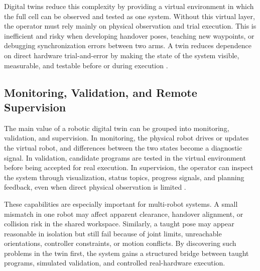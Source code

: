 Digital twins reduce this complexity by providing a virtual environment in which the full cell can be observed and tested as one system. Without this virtual layer, the operator must rely mainly on physical observation and trial execution. This is inefficient and risky when developing handover poses, teaching new waypoints, or debugging synchronization errors between two arms. A twin reduces dependence on direct hardware trial-and-error by making the state of the system visible, measurable, and testable before or during execution \cite{wang2017collaborative,tao2018digital}.

\subsection{Monitoring, Validation, and Remote Supervision}

The main value of a robotic digital twin can be grouped into monitoring, validation, and supervision. In monitoring, the physical robot drives or updates the virtual robot, and differences between the two states become a diagnostic signal. In validation, candidate programs are tested in the virtual environment before being accepted for real execution. In supervision, the operator can inspect the system through visualization, status topics, progress signals, and planning feedback, even when direct physical observation is limited \cite{glaessgen2012digital,wang2017collaborative}.

These capabilities are especially important for multi-robot systems. A small mismatch in one robot may affect apparent clearance, handover alignment, or collision risk in the shared workspace. Similarly, a taught pose may appear reasonable in isolation but still fail because of joint limits, unreachable orientations, controller constraints, or motion conflicts. By discovering such problems in the twin first, the system gains a structured bridge between taught programs, simulated validation, and controlled real-hardware execution.
